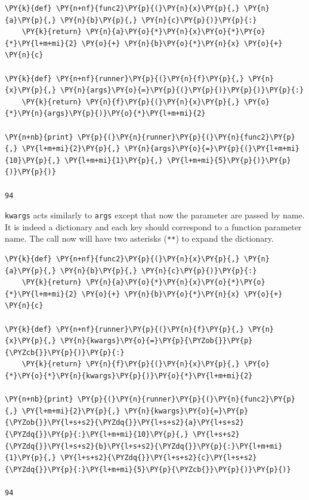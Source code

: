 \begin{codebox}[breakable, size=fbox, boxrule=1pt, pad at break*=1mm,colback=cellbackground, colframe=cellborder]
\begin{Verbatim}[commandchars=\\\{\}]
\PY{k}{def} \PY{n+nf}{func2}\PY{p}{(}\PY{n}{x}\PY{p}{,} \PY{n}{a}\PY{p}{,} \PY{n}{b}\PY{p}{,} \PY{n}{c}\PY{p}{)}\PY{p}{:}
    \PY{k}{return} \PY{n}{a}\PY{o}{*}\PY{n}{x}\PY{o}{*}\PY{o}{*}\PY{l+m+mi}{2} \PY{o}{+} \PY{n}{b}\PY{o}{*}\PY{n}{x} \PY{o}{+} \PY{n}{c}
 		
\PY{k}{def} \PY{n+nf}{runner}\PY{p}{(}\PY{n}{f}\PY{p}{,} \PY{n}{x}\PY{p}{,} \PY{n}{args}\PY{o}{=}\PY{p}{(}\PY{p}{)}\PY{p}{)}\PY{p}{:}
    \PY{k}{return} \PY{n}{f}\PY{p}{(}\PY{n}{x}\PY{p}{,} \PY{o}{*}\PY{n}{args}\PY{p}{)}\PY{o}{*}\PY{l+m+mi}{2}
 		
\PY{n+nb}{print} \PY{p}{(}\PY{n}{runner}\PY{p}{(}\PY{n}{func2}\PY{p}{,} \PY{l+m+mi}{2}\PY{p}{,} \PY{n}{args}\PY{o}{=}\PY{p}{(}\PY{l+m+mi}{10}\PY{p}{,} \PY{l+m+mi}{1}\PY{p}{,} \PY{l+m+mi}{5}\PY{p}{)}\PY{p}{)}\PY{p}{)}
 
94
\end{Verbatim}
\end{codebox}

\texttt{kwargs} acts similarly to \texttt{args} except that now the parameter are passed by 
name. It is indeed a dictionary and each key should correspond to a function parameter name. 
The call now will have two asterisks (\texttt{**}) to expand the dictionary.
 
\begin{codebox}[breakable, size=fbox, boxrule=1pt, pad at break*=1mm,colback=cellbackground, colframe=cellborder]
\begin{Verbatim}[commandchars=\\\{\}]
\PY{k}{def} \PY{n+nf}{func2}\PY{p}{(}\PY{n}{x}\PY{p}{,} \PY{n}{a}\PY{p}{,} \PY{n}{b}\PY{p}{,} \PY{n}{c}\PY{p}{)}\PY{p}{:}
    \PY{k}{return} \PY{n}{a}\PY{o}{*}\PY{n}{x}\PY{o}{*}\PY{o}{*}\PY{l+m+mi}{2} \PY{o}{+} \PY{n}{b}\PY{o}{*}\PY{n}{x} \PY{o}{+} \PY{n}{c}
 		
\PY{k}{def} \PY{n+nf}{runner}\PY{p}{(}\PY{n}{f}\PY{p}{,} \PY{n}{x}\PY{p}{,} \PY{n}{kwargs}\PY{o}{=}\PY{p}{\PYZob{}}\PY{p}{\PYZcb{}}\PY{p}{)}\PY{p}{:}
    \PY{k}{return} \PY{n}{f}\PY{p}{(}\PY{n}{x}\PY{p}{,} \PY{o}{*}\PY{o}{*}\PY{n}{kwargs}\PY{p}{)}\PY{o}{*}\PY{l+m+mi}{2}
 		
\PY{n+nb}{print} \PY{p}{(}\PY{n}{runner}\PY{p}{(}\PY{n}{func2}\PY{p}{,} \PY{l+m+mi}{2}\PY{p}{,} \PY{n}{kwargs}\PY{o}{=}\PY{p}{\PYZob{}}\PY{l+s+s2}{\PYZdq{}}\PY{l+s+s2}{a}\PY{l+s+s2}{\PYZdq{}}\PY{p}{:}\PY{l+m+mi}{10}\PY{p}{,} \PY{l+s+s2}{\PYZdq{}}\PY{l+s+s2}{b}\PY{l+s+s2}{\PYZdq{}}\PY{p}{:}\PY{l+m+mi}{1}\PY{p}{,} \PY{l+s+s2}{\PYZdq{}}\PY{l+s+s2}{c}\PY{l+s+s2}{\PYZdq{}}\PY{p}{:}\PY{l+m+mi}{5}\PY{p}{\PYZcb{}}\PY{p}{)}\PY{p}{)}
 
94
\end{Verbatim}
\end{codebox}
  
